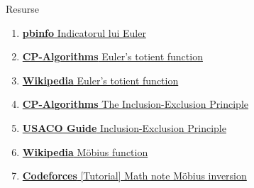 \documentclass[10pt]{beamer}
\begin{document}
\begin{frame}{Resurse}
  \begin{enumerate}\itemsep3pt\normalsize
    \item \href{https://www.pbinfo.ro/articole/18882/indicatorul-lui-euler}%
          {\textbf{pbinfo} \textemdash{} Indicatorul lui Euler}
    \item \href{https://cp-algorithms.com/algebra/phi-function.html}%
          {\textbf{CP-Algorithms} \textemdash{} Euler's totient function}
    \item \href{https://en.wikipedia.org/wiki/Euler\%27s_totient_function}%
          {\textbf{Wikipedia} \textemdash{} Euler's totient function}
    \item \href{https://cp-algorithms.com/combinatorics/inclusion-exclusion.html}%
          {\textbf{CP-Algorithms} \textemdash{} The Inclusion-Exclusion Principle}
    \item \href{https://usaco.guide/plat/PIE?lang=cpp}%
          {\textbf{USACO Guide} \textemdash{} Inclusion-Exclusion Principle}
    \item \href{https://en.wikipedia.org/wiki/M\%C3\%B6bius_function}%
          {\textbf{Wikipedia} \textemdash{} Möbius function}
    \item \href{https://codeforces.com/blog/entry/53925}%
          {\textbf{Codeforces} \textemdash{} [Tutorial] Math note \textemdash{} Möbius inversion}
  \end{enumerate}
\end{frame}
\end{document}
